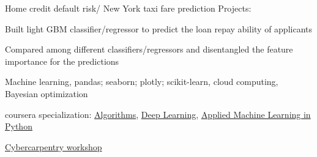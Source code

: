 \begin{cventries}
\rsexperience
    {Home credit default risk/ New York taxi fare prediction} %
    {Projects: } %
    {}
    {}
    {
      \begin{cvitems} %
      \item {Built light GBM classifier/regressor to predict the loan repay ability of applicants}
      \item {Compared among different classifiers/regressors and disentangled the feature importance for the predictions}
      \end{cvitems}
    }
	{Machine learning, pandas; seaborn; plotly; scikit-learn, cloud computing, Bayesian optimization}

\begin{flushleft}
\vspace{0.2cm}

\begin{cvitems} %
	\item {coursera specialization: \href{https://www.coursera.org/specializations/algorithms}{Algorithms}, \href{https://www.coursera.org/specializations/deep-learning}{Deep Learning}, \href{https://www.coursera.org/specializations/data-science-python}{Applied Machine Learning in Python}}
	\item {\href{http://cybercarpentry.web.unc.edu/}{Cybercarpentry workshop}}
\end{cvitems}
\end{flushleft}
\vspace{0.2cm}


\end{cventries}
